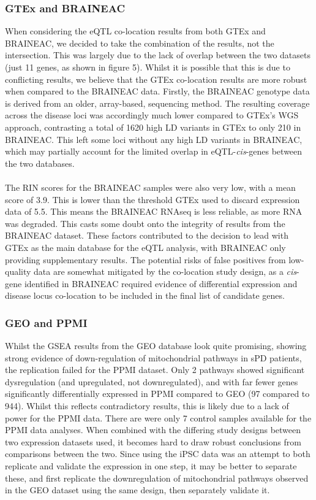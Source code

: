\documentclass{article}
\begin{document}
\subsubsection{GTEx and BRAINEAC}
When considering the eQTL co-location results from both GTEx and BRAINEAC, we decided to take the combination of the results, not the intersection. This was largely due to the lack of overlap between the two datasets (just 11 genes, as shown in figure 5). Whilst it is possible that this is due to conflicting results, we believe that the GTEx co-location results are more robust when compared to the BRAINEAC data. Firstly, the BRAINEAC genotype data is derived from an older, array-based, sequencing method. The resulting coverage across the disease loci was accordingly much lower compared to GTEx's WGS approach, contrasting a total of 1620 high LD variants in GTEx to only 210 in BRAINEAC. This left some loci without any high LD variants in BRAINEAC, which may partially account for the limited overlap in eQTL-\textit{cis}-genes between the two databases. 
\\
\\The RIN scores for the BRAINEAC samples were also very low, with a mean score of 3.9. This is lower than the threshold GTEx used to discard expression data of 5.5\cite{Aguet2020TheTissues}. This means the BRAINEAC RNAseq is less reliable, as more RNA was degraded. This casts some doubt onto the integrity of results from the BRAINEAC dataset. These factors contributed to the decision to lead with GTEx as the main database for the eQTL analysis, with BRAINEAC only providing supplementary results. The potential risks of false positives from low-quality data are somewhat mitigated by the co-location study design, as a \textit{cis}-gene identified in BRAINEAC required evidence of differential expression and disease locus co-location to be included in the final list of candidate genes.
\subsubsection{GEO and PPMI}
\label{subsubsec:GEOandPPMI}
Whilst the GSEA results from the GEO database look quite promising, showing strong evidence of down-regulation of mitochondrial pathways in sPD patients, the replication failed for the PPMI dataset. Only 2 pathways showed significant dysregulation (and upregulated, not downregulated), and with far fewer genes significantly differentially expressed in PPMI compared to GEO (97 compared to 944). Whilst this reflects contradictory results, this is likely due to a lack of power for the PPMI data. There are were only 7 control samples available for the PPMI data analyses. When combined with the differing study designs between two expression datasets used, it becomes hard to draw robust conclusions from comparisons between the two. Since using the iPSC data was an attempt to both replicate and validate the expression in one step, it may be better to separate these, and first replicate the downregulation of mitochondrial pathways observed in the GEO dataset using the same design, then separately validate it.
\end{document}
